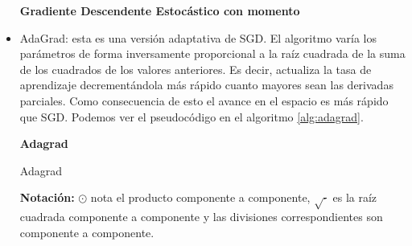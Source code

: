 \begin{itemize}
\begin{algorithm}[]{\Large{\textbf{Gradiente Descendente Estocástico con momento}}}
		\vspace{10px}
		
		
		\vspace{10px}
		
		
		\vspace{5px}
	\end{algorithm}

	\item AdaGrad: esta es una versión adaptativa de SGD. El algoritmo varía los parámetros de forma inversamente proporcional a la raíz cuadrada de la suma de los cuadrados de los valores anteriores. Es decir, actualiza la tasa de aprendizaje decrementándola más rápido cuanto mayores sean las derivadas parciales. Como consecuencia de esto el avance en el espacio es más rápido que SGD. Podemos ver el pseudocódigo en el algoritmo \ref{alg:adagrad}.
	
	\begin{algorithm}[]{\Large{\textbf{Adagrad}}}
		
		\vspace{15px}
		
		\caption{Adagrad}
		\label{alg:adagrad}
		\textbf{Notación:} $\odot$ nota el producto componente a componente, $\sqrt{\cdot}$ es la raíz cuadrada componente a componente y las divisiones correspondientes son componente a componente.
		
		
		\vspace{10px}
		

\end{algorithm}
\end{itemize}
